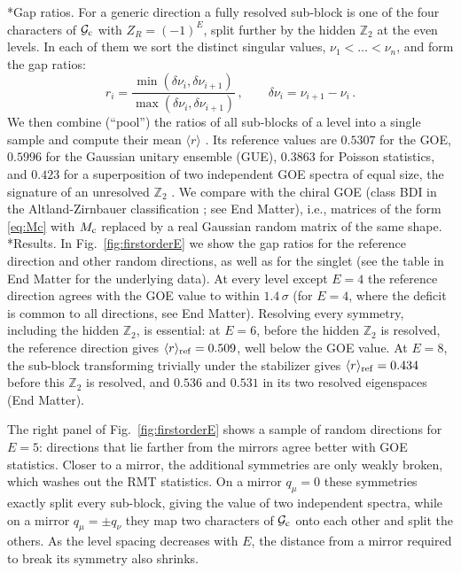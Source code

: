 \documentclass[aps,twocolumn,preprintnumbers,groupedaddress,nofootinbib,prl]{revtex4-2}
\makeatletter
\renewcommand\paragraph{\@startsection{paragraph}{4}{\parindent}{\z@}{-1em}{\normalfont\normalsize\bfseries}}
\newcommand{\cMat}{{\rm c}}
\newcommand{\rmean}{\langle r\rangle}
\newcommand{\Mc}{M_{\cMat}}
\newcommand{\Hc}{{\cal G}_{\cMat}}
\makeatother
\begin{document}
\paragraph*{Gap ratios.}
For a generic direction a fully resolved sub-block is one of the four characters of $\Hc$ with $Z_R=(-1)^E$, split further by the hidden $\mathbb Z_2$ at the even levels. In each of them we sort the distinct singular values, $\nu_1<\dots<\nu_n$, and form the gap ratios:
\begin{equation}
\label{eq:r}
r_i=\frac{\min(\delta\nu_i,\delta\nu_{i+1})}{\max(\delta\nu_i,\delta\nu_{i+1})}\,,\qquad \delta\nu_i=\nu_{i+1}-\nu_i\,.
\end{equation}
We then combine (``pool'') the ratios of all sub-blocks of a level into a single sample and compute their mean $\rmean$ \cite{Oganesyan:2007wpd,Atas:2013gvn}. Its reference values are $0.5307$ for the GOE, $0.5996$ for the Gaussian unitary ensemble (GUE), $0.3863$ for Poisson statistics, and $0.423$ for a superposition of two independent GOE spectra of equal size, the signature of an unresolved $\mathbb Z_2$ \cite{Giraud:2020mmb}. We compare with the chiral GOE (class BDI in the Altland-Zirnbauer classification \cite{Verbaarschot:1994qf,Altland:1997zz}; see End Matter), i.e., matrices of the form \eqref{eq:Mc} with $\Mc$ replaced by a real Gaussian random matrix of the same shape.\\

\paragraph*{Results.}
In Fig.~\ref{fig:firstorderE} we show the gap ratios for the reference direction and other random directions, as well as for the singlet (see the table in End Matter for the underlying data). At every level except $E=4$ the reference direction agrees with the GOE value to within $1.4\,\sigma$ (for $E=4$, where the deficit is common to all directions, see End Matter). Resolving every symmetry, including the hidden $\mathbb{Z}_2$, is essential: at $E=6$, before the hidden $\mathbb Z_2$ is resolved, the reference direction gives $\rmean_{\rm ref}=0.509$, well below the GOE value. At $E=8$, the sub-block transforming trivially under the stabilizer gives $\rmean_{\rm ref}=0.434$ before this $\mathbb Z_2$ is resolved, and $0.536$ and $0.531$ in its two resolved eigenspaces (End Matter).

The right panel of Fig.~\ref{fig:firstorderE} shows a sample of random directions for $E=5$: directions that lie farther from the mirrors agree better with GOE statistics. Closer to a mirror, the additional symmetries are only weakly broken, which washes out the RMT statistics.  On a mirror $q_\mu=0$ these symmetries exactly split every sub-block, giving the value of two independent spectra, while on a mirror $q_\mu=\pm q_\nu$ they map two characters of $\Hc$ onto each other and split the others. As the level spacing decreases with $E$, the distance from a mirror required to break its symmetry also shrinks.
\end{document}
